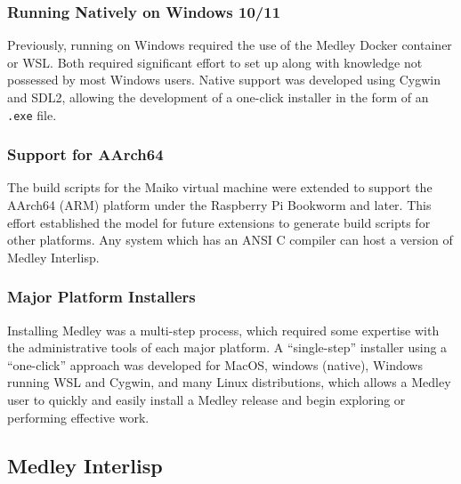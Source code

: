 \documentclass[sigconf]{acmart}
\begin{document}
\subsubsection{Running Natively on Windows 10/11}

Previously, running on Windows required the use of the Medley Docker container or WSL. Both required significant effort to set up along with knowledge not possessed by most Windows users. Native support was developed using Cygwin and SDL2, allowing the development of a one-click installer in the form of an \texttt{.exe} file.

\subsubsection{Support for AArch64}

The build scripts for the Maiko virtual machine were extended to support the AArch64 (ARM) platform under the Raspberry Pi Bookworm and later. This effort established the model for future extensions to generate build scripts for other platforms. Any system which has an ANSI C compiler can host a version of Medley Interlisp.




\subsubsection{Major Platform Installers}

Installing Medley was a multi-step process, which required some expertise with the administrative tools of each major platform. A ``single-step'' installer using a ``one-click'' approach was developed for MacOS, windows (native), Windows running WSL and Cygwin, and many Linux distributions, which allows a Medley user to quickly and easily install a Medley release and begin exploring or performing effective work.

\subsection{Medley Interlisp}
\end{document}
